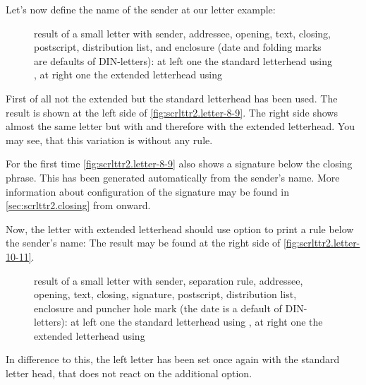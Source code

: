 \begin{Example}
  Let's now define the name of the sender at our letter example:
  \begin{figure}
    \centering
    \quad
    \caption[{Example: letter with sender, addressee, opening, text, closing,
      postscript, distribution list, and enclosure}]
    {result of a small letter with sender, addressee, opening, text, closing,
      postscript, distribution list, and enclosure (date and folding marks are
      defaults of DIN-letters): at left one the standard letterhead using
      , at right one the
      extended letterhead using }
    \label{fig:scrlttr2.letter-8-9}
  \end{figure}
  First of all not the extended but the standard letterhead has been used. The
  result is shown at the left side of \autoref{fig:scrlttr2.letter-8-9}. The
  right side shows almost the same letter but with
   and therefore with the extended
  letterhead. You may see, that this variation is without any rule.

  For the first time \autoref{fig:scrlttr2.letter-8-9} also shows a signature
  below the closing phrase. This has been generated automatically from the
  sender's name. More information about configuration of the signature may be
  found in  \autoref{sec:scrlttr2.closing} from
   onward.

  Now, the letter with extended letterhead should use option 
  to print a rule below the sender's name:%
  The result may be found at the right side of
  \autoref{fig:scrlttr2.letter-10-11}.
  \begin{figure}
    \centering
    \quad
    \caption[{Example: letter with sender, separation rule, addressee,
      opening, text, closing, signature, postscript, distribution list,
      enclosure, and puncher hole mark}]
    {result of a small letter with sender, separation rule, addressee,
      opening, text, closing, signature, postscript, distribution list,
      enclosure and puncher hole mark (the date is a default of DIN-letters):
      at left one the standard letterhead using
      , at right one the extended letterhead
      using }
    \label{fig:scrlttr2.letter-10-11}
  \end{figure}
  In difference to this, the left letter has been set once again with the
  standard letter head, that does not react on the additional option.
\end{Example}

